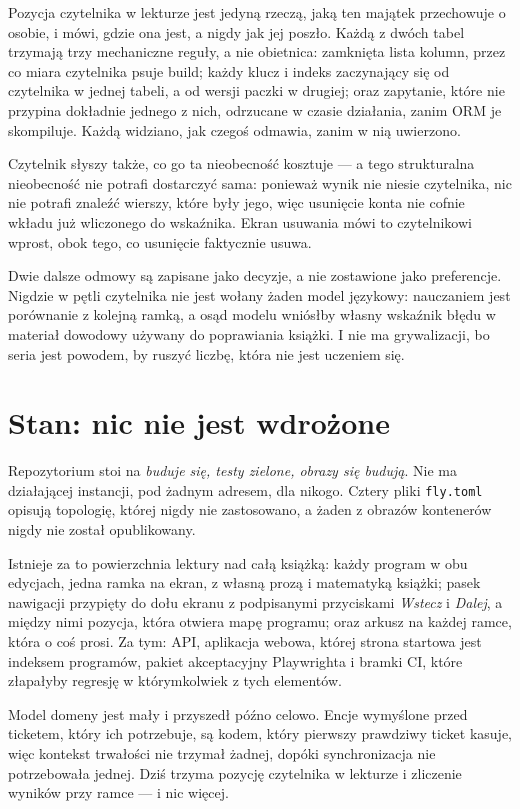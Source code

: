 \documentclass[11pt,a4paper]{article}
\begin{document}
Pozycja czytelnika w lekturze jest jedyną rzeczą, jaką ten majątek przechowuje o osobie, i
mówi, gdzie ona jest, a nigdy jak jej poszło. Każdą z dwóch tabel trzymają trzy mechaniczne
reguły, a nie obietnica: zamknięta lista kolumn, przez co miara czytelnika psuje build; każdy
klucz i indeks zaczynający się od czytelnika w jednej tabeli, a od wersji paczki w drugiej;
oraz zapytanie, które nie przypina dokładnie jednego z nich, odrzucane w czasie działania,
zanim ORM je skompiluje. Każdą widziano, jak czegoś odmawia, zanim w nią uwierzono.

Czytelnik słyszy także, co go ta nieobecność kosztuje --- a tego strukturalna nieobecność nie
potrafi dostarczyć sama: ponieważ wynik nie niesie czytelnika, nic nie potrafi znaleźć
wierszy, które były jego, więc usunięcie konta nie cofnie wkładu już wliczonego do wskaźnika.
Ekran usuwania mówi to czytelnikowi wprost, obok tego, co usunięcie faktycznie usuwa.

Dwie dalsze odmowy są zapisane jako decyzje, a nie zostawione jako preferencje. Nigdzie w
pętli czytelnika nie jest wołany żaden model językowy: nauczaniem jest porównanie z kolejną
ramką, a osąd modelu wniósłby własny wskaźnik błędu w materiał dowodowy używany do poprawiania
książki. I nie ma grywalizacji, bo seria jest powodem, by ruszyć liczbę, która nie jest
uczeniem się.

\section{Stan: nic nie jest wdrożone}

Repozytorium stoi na \emph{buduje się, testy zielone, obrazy się budują}. Nie ma działającej
instancji, pod żadnym adresem, dla nikogo. Cztery pliki \texttt{fly.toml} opisują topologię,
której nigdy nie zastosowano, a żaden z obrazów kontenerów nigdy nie został opublikowany.

Istnieje za to powierzchnia lektury nad całą książką: każdy program w obu edycjach, jedna
ramka na ekran, z własną prozą i matematyką książki; pasek nawigacji przypięty do dołu
ekranu z podpisanymi przyciskami \emph{Wstecz} i \emph{Dalej}, a między nimi pozycja, która
otwiera mapę programu; oraz arkusz na każdej ramce, która o coś prosi. Za tym:
API, aplikacja webowa, której strona startowa jest indeksem programów, pakiet akceptacyjny
Playwrighta i bramki CI, które złapałyby regresję w którymkolwiek z tych elementów.

Model domeny jest mały i przyszedł późno celowo. Encje wymyślone przed ticketem, który ich
potrzebuje, są kodem, który pierwszy prawdziwy ticket kasuje, więc kontekst trwałości nie
trzymał żadnej, dopóki synchronizacja nie potrzebowała jednej. Dziś trzyma pozycję czytelnika w
lekturze i zliczenie wyników przy ramce --- i nic więcej.
\end{document}
